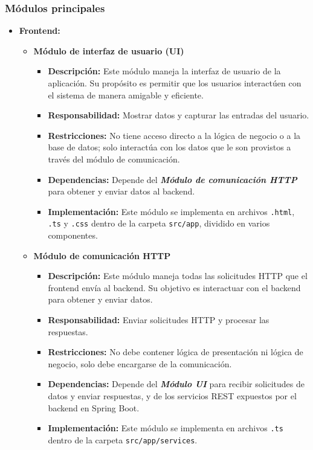 \documentclass{article} %
\begin{document}
    \subsubsection{Módulos principales}
    \begin{itemize}
        \item \textbf{Frontend:} 
        \begin{itemize}
            \item \textbf{Módulo de interfaz de usuario (UI)}
                \begin{itemize}
                    \item \textbf{Descripción:} Este módulo maneja la interfaz de usuario de la aplicación. Su propósito es permitir que los usuarios interactúen con el sistema de manera amigable y eficiente.
                    \item \textbf{Responsabilidad:} Mostrar datos y capturar las entradas del usuario.
                    \item \textbf{Restricciones:} No tiene acceso directo a la lógica de negocio o a la base de datos; solo interactúa con los datos que le son provistos a través del módulo de comunicación.
                    \item \textbf{Dependencias:} Depende del \textbf{\emph{Módulo de comunicación HTTP}} para obtener y enviar datos al backend.
                    \item \textbf{Implementación:} Este módulo se implementa en archivos \texttt{.html}, \texttt{.ts} y \texttt{.css} dentro de la carpeta \texttt{src/app}, dividido en varios componentes.
                \end{itemize}
            \item \textbf{Módulo de comunicación HTTP}
                \begin{itemize}
                    \item \textbf{Descripción:} Este módulo maneja todas las solicitudes HTTP que el frontend envía al backend. Su objetivo es interactuar con el backend para obtener y enviar datos.
                    \item \textbf{Responsabilidad:} Enviar solicitudes HTTP y procesar las respuestas.
                    \item \textbf{Restricciones:} No debe contener lógica de presentación ni lógica de negocio, solo debe encargarse de la comunicación.
                    \item \textbf{Dependencias:} Depende del \textbf{\emph{Módulo UI}} para recibir solicitudes de datos y enviar respuestas, y de los servicios REST expuestos por el backend en Spring Boot.
                    \item \textbf{Implementación:} Este módulo se implementa en archivos \texttt{.ts} dentro de la carpeta \texttt{src/app/services}.
                \end{itemize}
        \end{itemize}
        

\end{itemize}
\end{document}
